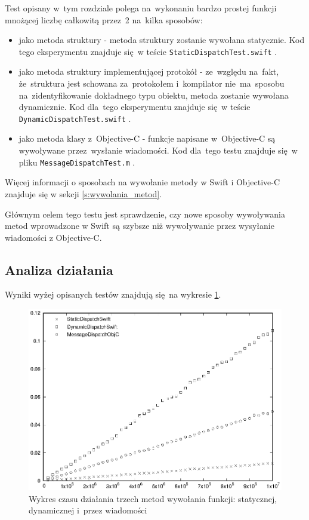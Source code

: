 \documentclass[mgr, shortabstract]{iithesis}
\newcommand{\swiftinline}[1]{
    \texttt{#1}
}
\begin{document}
Test opisany w~tym rozdziale polega na~wykonaniu bardzo prostej funkcji mnożącej liczbę całkowitą przez~2 na~kilka sposobów:

\begin{itemize}
    \item jako metoda struktury - metoda struktury zostanie wywołana statycznie. Kod tego eksperymentu znajduje się w teście \swiftinline{StaticDispatchTest.swift}.
    \item jako metoda struktury implementującej protokół - ze~względu na~fakt, że~struktura jest schowana za~protokołem i~kompilator nie~ma~sposobu na~zidentyfikowanie dokładnego typu obiektu, metoda zostanie wywołana dynamicznie. Kod dla~tego eksperymentu znajduje się w teście \swiftinline{DynamicDispatchTest.swift}.
    \item jako metoda klasy z~Objective-C - funkcje napisane w~Objective-C są wywoływane przez~wysłanie wiadomości. Kod dla~tego testu znajduje się w pliku \swiftinline{MessageDispatchTest.m}.
\end{itemize}

Więcej informacji o sposobach na wywołanie metody w Swift i Objective-C znajduje się w sekcji \ref{s:wywolania_metod}.

Głównym celem tego testu jest sprawdzenie, czy nowe sposoby wywoływania metod wprowadzone w Swift są szybsze niż wywoływanie przez wysyłanie wiadomości z Objective-C.

\subsection{Analiza działania}

Wyniki wyżej opisanych testów znajdują się na wykresie \ref{p:dispatch_method}.

\begin{figure}[ht]
    \includegraphics{plots/Dispatch.eps}
    \caption{Wykres czasu działania trzech metod wywołania funkcji: statycznej, dynamicznej i~przez wiadomości}
    \label{p:dispatch_method}
\end{figure}
\end{document}
